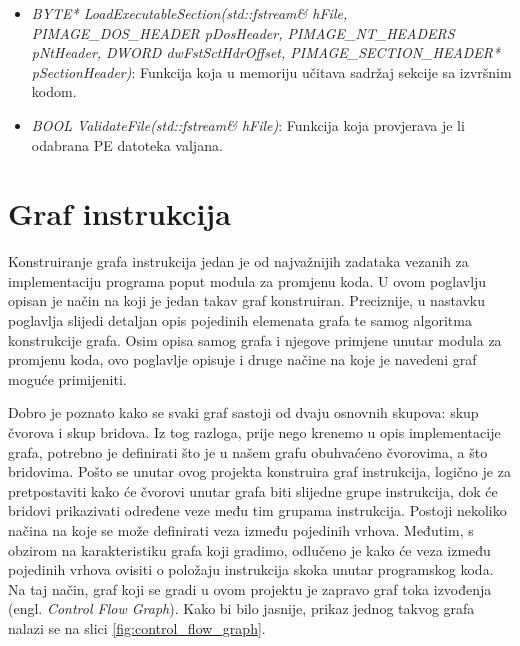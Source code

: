 \documentclass[times, utf8, diplomski, numeric]{fer}
\begin{document}
\begin{itemize}
\item {\footnotesize \emph{BYTE*
LoadExecutableSection(std::fstream\& hFile, PIMAGE\_DOS\_HEADER
pDosHeader, PIMAGE\_NT\_HEADERS pNtHeader, DWORD
dwFstSctHdrOffset, PIMAGE\_SECTION\_HEADER* pSectionHeader)}}:
Funkcija koja u memoriju učitava sadržaj sekcije sa izvršnim
kodom.

\item {\footnotesize \emph{BOOL ValidateFile(std::fstream\&
hFile)}}: Funkcija koja provjerava je li odabrana PE datoteka
valjana.

\end{itemize}

\section{Graf instrukcija}
\label{scr:instructionGraph}

Konstruiranje grafa instrukcija jedan je od najvažnijih zadataka vezanih za
implementaciju programa poput modula za promjenu koda. U ovom poglavlju opisan
je način na koji je jedan takav graf konstruiran. Preciznije, u nastavku
poglavlja slijedi detaljan opis pojedinih elemenata grafa te samog algoritma
konstrukcije grafa. Osim opisa samog grafa i njegove primjene unutar modula za
promjenu koda, ovo poglavlje opisuje i druge načine na koje je navedeni graf		%
moguće primijeniti. 									%

Dobro je poznato kako se svaki graf sastoji od dvaju osnovnih skupova: skup
čvorova i skup bridova. Iz tog razloga, prije nego krenemo u opis
implementacije grafa, potrebno je definirati što je u našem grafu obuhvaćeno
čvorovima, a što bridovima. Pošto se unutar ovog projekta konstruira graf
instrukcija, logično je za pretpostaviti kako će čvorovi unutar grafa biti
slijedne grupe instrukcija, dok će bridovi prikazivati određene veze među tim
grupama instrukcija. Postoji nekoliko načina na koje se može definirati veza
između pojedinih vrhova. Međutim, s obzirom na karakteristiku grafa koji
gradimo, odlučeno je kako će veza između pojedinih vrhova ovisiti o položaju
instrukcija skoka unutar programskog koda. Na taj način, graf koji se gradi u
ovom projektu je zapravo graf toka izvođenja (engl. \emph{Control Flow Graph}).
Kako bi bilo jasnije, prikaz jednog takvog grafa nalazi se na slici
\ref{fig:control_flow_graph}.
\end{document}
